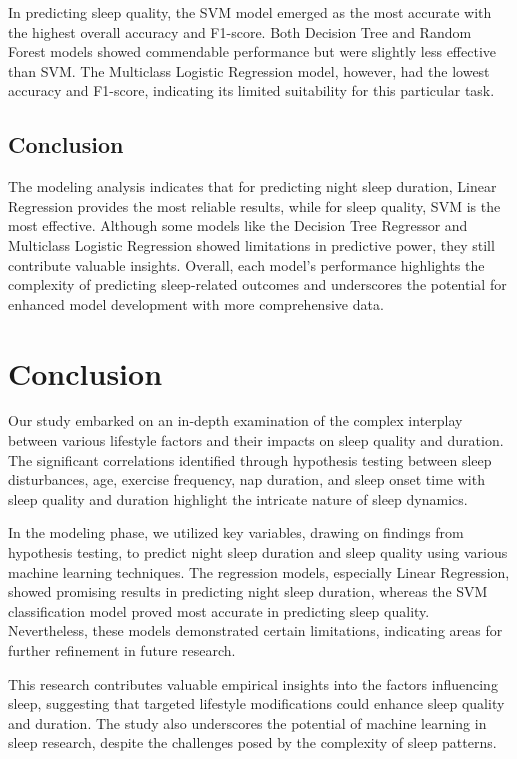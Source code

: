 \documentclass[conference]{IEEEtran}
\begin{document}
In predicting sleep quality, the SVM model emerged as the most accurate with the highest overall accuracy and F1-score. Both Decision Tree and Random Forest models showed commendable performance but were slightly less effective than SVM. The Multiclass Logistic Regression model, however, had the lowest accuracy and F1-score, indicating its limited suitability for this particular task.

\subsection*{Conclusion}
The modeling analysis indicates that for predicting night sleep duration, Linear Regression provides the most reliable results, while for sleep quality, SVM is the most effective. Although some models like the Decision Tree Regressor and Multiclass Logistic Regression showed limitations in predictive power, they still contribute valuable insights. Overall, each model's performance highlights the complexity of predicting sleep-related outcomes and underscores the potential for enhanced model development with more comprehensive data.

\section{Conclusion}

Our study embarked on an in-depth examination of the complex interplay between various lifestyle factors and their impacts on sleep quality and duration. The significant correlations identified through hypothesis testing between sleep disturbances, age, exercise frequency, nap duration, and sleep onset time with sleep quality and duration highlight the intricate nature of sleep dynamics.

In the modeling phase, we utilized key variables, drawing on findings from hypothesis testing, to predict night sleep duration and sleep quality using various machine learning techniques. The regression models, especially Linear Regression, showed promising results in predicting night sleep duration, whereas the SVM classification model proved most accurate in predicting sleep quality. Nevertheless, these models demonstrated certain limitations, indicating areas for further refinement in future research.

This research contributes valuable empirical insights into the factors influencing sleep, suggesting that targeted lifestyle modifications could enhance sleep quality and duration. The study also underscores the potential of machine learning in sleep research, despite the challenges posed by the complexity of sleep patterns.
\end{document}
